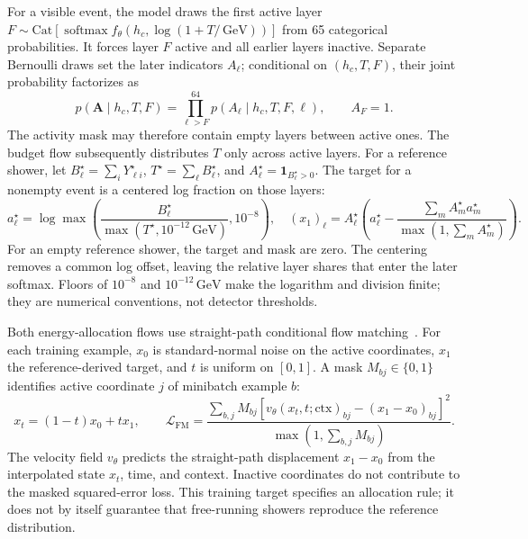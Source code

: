\documentclass[11pt]{article}
\newcommand{\GeV}{\,\mathrm{GeV}}
\begin{document}
For a visible event, the model draws the first active layer $F\sim\mathrm{Cat}[\operatorname{softmax}f_\theta(h_c,\log(1+T/\GeV))]$ from 65 categorical probabilities. It forces layer $F$ active and all earlier layers inactive. Separate Bernoulli draws set the later indicators $A_\ell$; conditional on $(h_c,T,F)$, their joint probability factorizes as
\begin{equation}
 p(\mathbf A\mid h_c,T,F)=\prod_{\ell>F}^{64}p(A_\ell\mid h_c,T,F,\ell),
 \qquad A_F=1.
 \label{eq:activity}
\end{equation}
The activity mask may therefore contain empty layers between active ones. The budget flow subsequently distributes $T$ only across active layers. For a reference shower, let $B_\ell^\star=\sum_iY_{\ell i}^\star$, $T^\star=\sum_\ell B_\ell^\star$, and $A_\ell^\star=\mathbf 1_{B_\ell^\star>0}$. The target for a nonempty event is a centered log fraction on those layers:
\begin{equation}
 a_\ell^\star=\log\max\!\left(
 \frac{B_\ell^\star}{\max(T^\star,10^{-12}\GeV)},10^{-8}\right),
 \quad (x_1)_\ell=A_\ell^\star\left(
 a_\ell^\star-\frac{\sum_m A_m^\star a_m^\star}
 {\max(1,\sum_m A_m^\star)}\right).
 \label{eq:profile_target}
\end{equation}
For an empty reference shower, the target and mask are zero. The centering removes a common log offset, leaving the relative layer shares that enter the later softmax. Floors of $10^{-8}$ and $10^{-12}\GeV$ make the logarithm and division finite; they are numerical conventions, not detector thresholds.

Both energy-allocation flows use straight-path conditional flow matching~\cite{flowmatching}. For each training example, $x_0$ is standard-normal noise on the active coordinates, $x_1$ the reference-derived target, and $t$ is uniform on $[0,1]$. A mask $M_{bj}\in\{0,1\}$ identifies active coordinate $j$ of minibatch example $b$:
\begin{equation}
 x_t=(1-t)x_0+t x_1,\qquad
 \mathcal L_{\mathrm{FM}}=
 \frac{\sum_{b,j}M_{bj}
 [v_\theta(x_t,t;\mathrm{ctx})_{bj}-(x_1-x_0)_{bj}]^2}
 {\max(1,\sum_{b,j}M_{bj})}.
 \label{eq:cfm}
\end{equation}
The velocity field $v_\theta$ predicts the straight-path displacement $x_1-x_0$ from the interpolated state $x_t$, time, and context. Inactive coordinates do not contribute to the masked squared-error loss. This training target specifies an allocation rule; it does not by itself guarantee that free-running showers reproduce the reference distribution.
\end{document}
